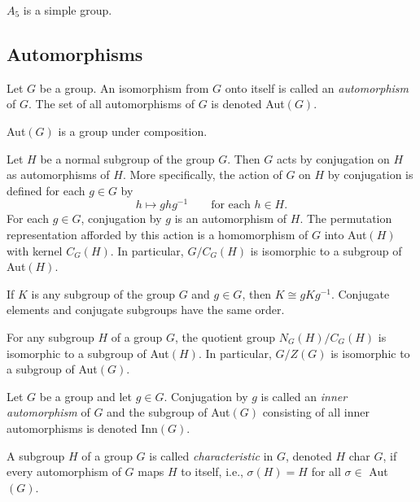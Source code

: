 \documentclass[../main]{subfiles}
\begin{document}
 
 \begin{thm}
  $A_5$ is a simple group.
 \end{thm}
 
 
 \subsection{Automorphisms}
 
 
 \begin{dfn}
  Let $G$ be a group. An isomorphism from $G$ onto itself is called an \textit{automorphism} of $G$. The set of all automorphisms of $G$ is denoted Aut$(G)$. 
 \end{dfn}
 
 
 \begin{nt}
  Aut$(G)$ is a group under composition.
 \end{nt}
 
 
 \begin{prop}
  Let $H$ be a normal subgroup of the group $G$. Then $G$ acts by conjugation on $H$ as automorphisms of $H$. More specifically, the action of $G$ on $H$ by conjugation is defined for each $g \in G$ by 
  \[ h\mapsto ghg^{-1}\qquad \text{for each } h \in H.\]
  For each $g \in G$, conjugation by $g$ is an automorphism of $H$. The permutation representation afforded by this action is a homomorphism of $G$ into Aut$(H)$ with kernel $C_G(H)$. In particular, $G/C_G(H)$ is isomorphic to a subgroup of Aut$(H)$.
 \end{prop}
 
 
 \begin{cor}
  If $K$ is any subgroup of the group $G$ and $g\in G$, then $K \cong gKg^{-1}$. Conjugate elements and conjugate subgroups have the same order.  
 \end{cor}
 
 
 \begin{cor}
  For any subgroup $H$ of a group $G$, the quotient group $N_G(H)/C_G(H)$ is isomorphic to a subgroup of Aut$(H)$. In particular, $G/Z(G)$ is isomorphic to a subgroup of Aut$(G)$.
 \end{cor}
 
 
 \begin{dfn}
  Let $G$ be a group and let $g \in G$. Conjugation by $g$ is called an \textit{inner automorphism} of $G$ and the subgroup of Aut$(G)$ consisting of all inner automorphisms is denoted Inn$(G)$.
 \end{dfn}
 
 
 \begin{dfn}
  A subgroup $H$ of a group $G$ is called \textit{characteristic} in $G$, denoted $H$ char $G$, if every automorphism of $G$ maps $H$ to itself, i.e., $\sigma(H)=H$ for all $\sigma \in$ Aut$(G)$.
 \end{dfn}
 
\end{document}
